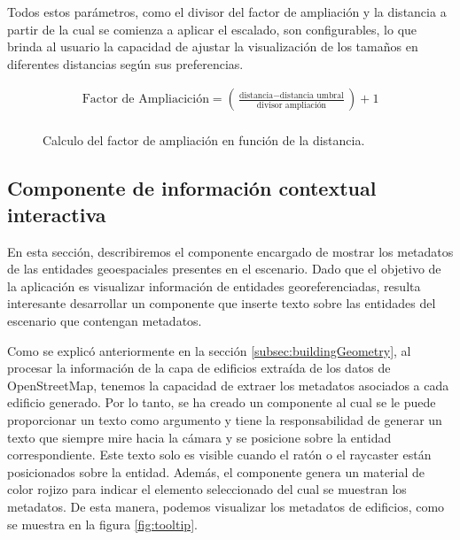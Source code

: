 \documentclass[a4paper, 11pt]{book}
\begin{document}
Todos estos parámetros, como el divisor del factor de ampliación y la distancia a partir de la cual se comienza a aplicar el escalado, son configurables, lo que brinda al usuario la capacidad de ajustar la visualización de los tamaños en diferentes distancias según sus preferencias.

\begin{figure}[H]
\begin{align*}
\text{{Factor de Ampliacición}} = \left(\frac{{\text{{distancia}} - \text{{distancia umbral}}}}{{\text{{divisor ampliación}}}}\right) + 1\\
\end{align*}
\caption{Calculo del factor de ampliación en función de la distancia.}
  \label{formula:ampliación}
\end{figure}

\subsection{Componente de información contextual interactiva}
\label{subsec:tooltip}
En esta sección, describiremos el componente encargado de mostrar los metadatos de las entidades geoespaciales presentes en el escenario. Dado que el objetivo de la aplicación es visualizar información de entidades georeferenciadas, resulta interesante desarrollar un componente que inserte texto sobre las entidades del escenario que contengan metadatos.

Como se explicó anteriormente en la sección \ref{subsec:buildingGeometry}, al procesar la información de la capa de edificios extraída de los datos de OpenStreetMap, tenemos la capacidad de extraer los metadatos asociados a cada edificio generado. Por lo tanto, se ha creado un componente al cual se le puede proporcionar un texto como argumento y tiene la responsabilidad de generar un texto que siempre mire hacia la cámara y se posicione sobre la entidad correspondiente. Este texto solo es visible cuando el ratón o el raycaster están posicionados sobre la entidad. Además, el componente genera un material de color rojizo para indicar el elemento seleccionado del cual se muestran los metadatos. De esta manera, podemos visualizar los metadatos de edificios, como se muestra en la figura \ref{fig:tooltip}.
\end{document}
